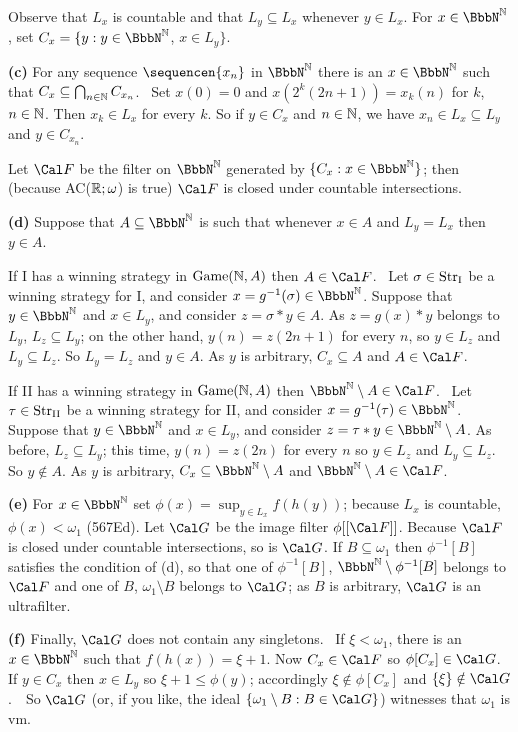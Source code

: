 {\noindent Observe that $L_x$ is countable and that $L_y\subseteq L_x$
whenever $y\in L_x$.   For $x\in\NN$, set $C_x=\{y:y\in\NN$, $x\in L_y\}$.

\medskip

{\bf (c)} For any sequence $\sequencen{x_n}$ in $\NN$ there is an
$x\in\NN$ such that $C_x\subseteq\bigcap_{n\in\Bbb N}C_{x_n}$.   \Prf\ Set
$x(0)=0$ and $x(2^k(2n+1))=x_k(n)$ for $k$, $n\in\Bbb N$.
Then $x_k\in L_x$
for every $k$.   So if $y\in C_x$ and $n\in\Bbb N$, we have
$x_n\in L_x\subseteq L_y$ and $y\in C_{x_n}$.\ \Qed

Let $\Cal F$ be the filter on $\NN$ generated by $\{C_x:x\in\NN\}$;  then
(because AC($\Bbb R;\omega$) is true)
$\Cal F$ is closed under countable intersections.

\medskip

{\bf (d)} Suppose that $A\subseteq\NN$ is such that whenever $x\in A$ and
$L_y=L_x$ then $y\in A$.

\medskip

 If I has a winning strategy in $\Game(\Bbb N,A)$ then
$A\in\Cal F$.   \Prf\ Let $\sigma\in\StrI$ be a winning strategy for I, and
consider $x=g^{-1}(\sigma)\in\NN$.   Suppose that $y\in\NN$ and
$x\in L_y$, and consider $z=\sigma*y\in A$.   As $z=g(x)*y$ belongs to
$L_y$, $L_z\subseteq L_y$;  on the other hand,
$y(n)=z(2n+1)$ for every $n$, so $y\in L_z$ and $L_y\subseteq L_z$.
So $L_y=L_z$ and $y\in A$.
As $y$ is arbitrary, $C_x\subseteq A$ and $A\in\Cal F$.\ \Qed

\medskip

 If II has a winning strategy in $\Game(\Bbb N,A)$ then
$\NN\setminus A\in\Cal F$.   \Prf\ Let $\tau\in\StrII$ be a winning
strategy for II, and
consider $x=g^{-1}(\tau)\in\NN$.   Suppose that $y\in\NN$ and
$x\in L_y$, and consider $z=\tau*y\in\NN\setminus A$.   As before,
$L_z\subseteq L_y$;  this time,
$y(n)=z(2n)$ for every $n$ so $y\in L_z$ and $L_y\subseteq L_z$.
So $y\notin A$.   As $y$ is arbitrary, $C_x\subseteq\NN\setminus A$ and
$\NN\setminus A\in\Cal F$.\ \Qed

\medskip

{\bf (e)} For $x\in\NN$ set $\phi(x)=\sup_{y\in L_x}f(h(y))$;  because
$L_x$ is countable, $\phi(x)<\omega_1$ (567Ed).   Let $\Cal G$ be the image
filter $\phi[[\Cal F]]$.   Because $\Cal F$ is closed under countable
intersections, so is $\Cal G$.   If $B\subseteq\omega_1$ then $\phi^{-1}[B]$
satisfies the condition of (d), so that one of $\phi^{-1}[B]$,
$\NN\setminus\phi^{-1}[B]$ belongs to $\Cal F$ and one of $B$,
$\omega_1\setminus B$ belongs to $\Cal G$;  as $B$ is arbitrary, $\Cal G$
is an ultrafilter.

\medskip

{\bf (f)} Finally, $\Cal G$ does not contain any singletons.   \Prf\ If
$\xi<\omega_1$, there is an $x\in\NN$ such that $f(h(x))=\xi+1$.   Now
$C_x\in\Cal F$ so $\phi[C_x]\in\Cal G$.   If $y\in C_x$ then $x\in L_y$ so
$\xi+1\le\phi(y)$;  accordingly $\xi\notin\phi[C_x]$ and
$\{\xi\}\notin\Cal G$.\ \QeD\   So $\Cal G$ (or, if you like, the ideal
$\{\omega_1\setminus B:B\in\Cal G\}$) witnesses that $\omega_1$ is \2vm.
}%

